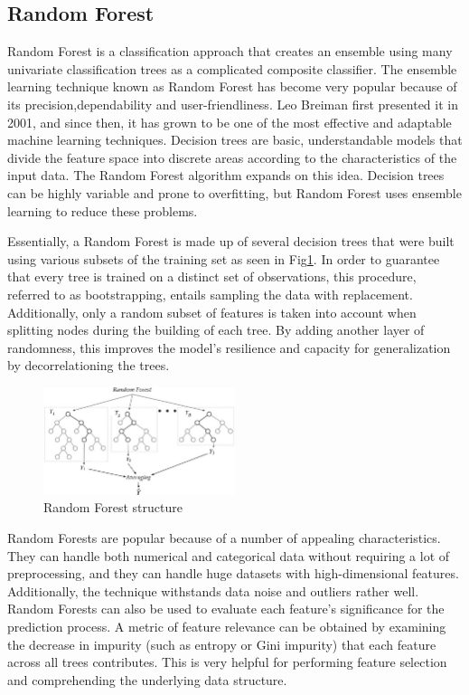 \documentclass[conference]{IEEEtran}
\begin{document}
\subsection{Random Forest}
Random Forest is a classification approach that creates an ensemble using many univariate classification trees as a complicated composite classifier.\cite{agjee2018impact} The ensemble learning technique known as Random Forest has become very popular because of its precision,dependability and user-friendliness. Leo Breiman first presented it in 2001, and since then, it has grown to be one of the most effective and adaptable machine learning techniques.\cite{rigatti2017random} Decision trees are basic, understandable models that divide the feature space into discrete areas according to the characteristics of the input data. The Random Forest algorithm expands on this idea. Decision trees can be highly variable and prone to overfitting, but Random Forest uses ensemble learning to reduce these problems.

Essentially, a Random Forest is made up of several decision trees that were built using various subsets of the training set as seen in Fig\ref{fig:RF}. In order to guarantee that every tree is trained on a distinct set of observations, this procedure, referred to as bootstrapping, entails sampling the data with replacement. Additionally, only a random subset of features is taken into account when splitting nodes during the building of each tree. By adding another layer of randomness, this improves the model's resilience and capacity for generalization by decorrelationing the trees. \cite{phdthesis1}
\begin{figure}[htbp]
\centerline{\includegraphics[width=0.5\textwidth]{Images/RFstructure.jpg}}
\caption{Random Forest structure \cite{agjee2018impact}}
\label{fig:RF}
\end{figure}

Random Forests are popular because of a number of appealing characteristics. They can handle both numerical and categorical data without requiring a lot of preprocessing, and they can handle huge datasets with high-dimensional features.\cite{biau2016random} Additionally, the technique withstands data noise and outliers rather well. Random Forests can also be used to evaluate each feature's significance for the prediction process. A metric of feature relevance can be obtained by examining the decrease in impurity (such as entropy or Gini impurity) that each feature across all trees contributes. This is very helpful for performing feature selection and comprehending the underlying data structure.
\end{document}
